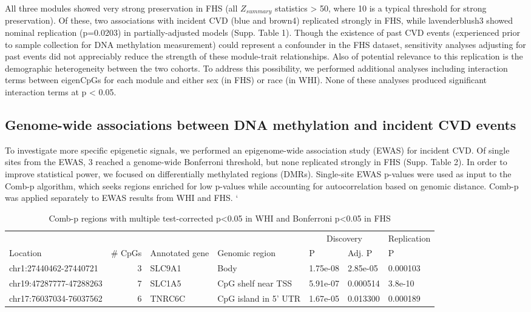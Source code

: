 \documentclass[]{article}
\theoremstyle{definition}
\theoremstyle{definition}
\theoremstyle{definition}
\theoremstyle{remark}
\begin{document}
All three modules showed very strong preservation in FHS (all
\(Z_{summary}\) statistics \textgreater{} 50, where 10 is a typical
threshold for strong preservation). Of these, two associations with
incident CVD (blue and brown4) replicated strongly in FHS, while
lavenderblush3 showed nominal replication (p=0.0203) in
partially-adjusted models (Supp. Table 1). Though the existence of past
CVD events (experienced prior to sample collection for DNA methylation
measurement) could represent a confounder in the FHS dataset,
sensitivity analyses adjusting for past events did not appreciably
reduce the strength of these module-trait relationships. Also of
potential relevance to this replication is the demographic heterogeneity
between the two cohorts. To address this possibility, we performed
additional analyses including interaction terms between eigenCpGs for
each module and either sex (in FHS) or race (in WHI). None of these
analyses produced significant interaction terms at p \textless{} 0.05.

\subsection{Genome-wide associations between DNA methylation and
incident CVD
events}\label{genome-wide-associations-between-dna-methylation-and-incident-cvd-events}

To investigate more specific epigenetic signals, we performed an
epigenome-wide association study (EWAS) for incident CVD. Of single
sites from the EWAS, 3 reached a genome-wide Bonferroni threshold, but
none replicated strongly in FHS (Supp. Table 2). In order to improve
statistical power, we focused on differentially methylated regions
(DMRs). Single-site EWAS p-values were used as input to the Comb-p
algorithm, which seeks regions enriched for low p-values while
accounting for autocorrelation based on genomic distance. Comb-p was
applied separately to EWAS results from WHI and FHS. `

\begin{table}

\caption{\label{tab:combp-results}Comb-p regions with multiple test-corrected p<0.05 in WHI and Bonferroni p<0.05 in FHS}
\centering
\begin{tabular}[t]{lrlllll}
\toprule
\multicolumn{1}{c}{} & \multicolumn{1}{c}{} & \multicolumn{1}{c}{} & \multicolumn{1}{c}{} & \multicolumn{2}{c}{Discovery} & \multicolumn{1}{c}{Replication} \\
\cmidrule(l{2pt}r{2pt}){5-6} \cmidrule(l{2pt}r{2pt}){7-7}
Location & \# CpGs & Annotated gene & Genomic region & P & Adj. P & P\\
\midrule
chr1:27440462-27440721 & 3 & SLC9A1 & Body & 1.75e-08 & 2.85e-05 & 0.000103\\
chr19:47287777-47288263 & 7 & SLC1A5 & CpG shelf near TSS & 5.91e-07 & 0.000514 & 3.8e-10\\
chr17:76037034-76037562 & 6 & TNRC6C & CpG island in 5' UTR & 1.67e-05 & 0.013300 & 0.000189\\
\bottomrule
\end{tabular}
\end{table}
\end{document}
